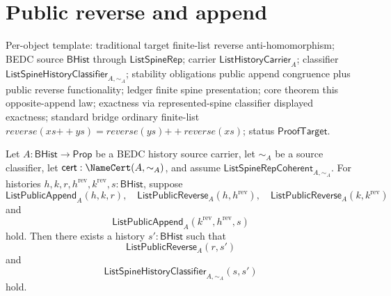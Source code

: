 \section{Public reverse and append}
\label{sec:list-public-reverse-append-antimorphism}

\begin{theorem}
\label{thm:list-public-reverse-append-antimorphism}
Per-object template: traditional target finite-list reverse anti-homomorphism;
BEDC source $\mathsf{BHist}$ through $\mathsf{ListSpineRep}$; carrier
$\mathsf{ListHistoryCarrier}_A$; classifier
$\mathsf{ListSpineHistoryClassifier}_{A,\sim_A}$; stability obligations public
append congruence plus public reverse functionality; ledger finite spine
presentation; core theorem this opposite-append law; exactness via
represented-spine classifier displayed exactness; standard bridge ordinary
finite-list $reverse(xs{++}ys)=reverse(ys){++}reverse(xs)$; status
$\mathsf{ProofTarget}$.

Let $A:\mathsf{BHist}\to\mathsf{Prop}$ be a BEDC history source carrier, let
$\sim_A$ be a source classifier, let $\mathsf{cert}:\NameCert(A,\sim_A)$, and
assume $\mathsf{ListSpineRepCoherent}_{A,\sim_A}$. For histories
$h,k,r,h^{\mathrm{rev}},k^{\mathrm{rev}},s:\mathsf{BHist}$, suppose
$$
\mathsf{ListPublicAppend}_A(h,k,r),
\quad
\mathsf{ListPublicReverse}_A(h,h^{\mathrm{rev}}),
\quad
\mathsf{ListPublicReverse}_A(k,k^{\mathrm{rev}})
$$
and
$$
\mathsf{ListPublicAppend}_A(k^{\mathrm{rev}},h^{\mathrm{rev}},s)
$$
hold. Then there exists a history $s':\mathsf{BHist}$ such that
$$
\mathsf{ListPublicReverse}_A(r,s')
$$
and
$$
\mathsf{ListSpineHistoryClassifier}_{A,\sim_A}(s,s')
$$
hold.
\end{theorem}
